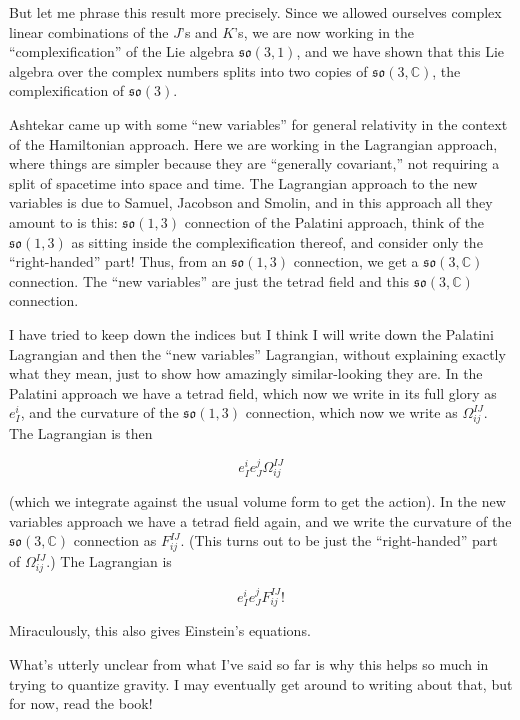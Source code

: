 \documentclass{article}
\begin{document}
But let me phrase this result more precisely. Since we allowed ourselves
complex linear combinations of the \(J\)'s and \(K\)'s, we are now
working in the ``complexification'' of the Lie algebra
\(\mathfrak{so}(3,1)\), and we have shown that this Lie algebra over the
complex numbers splits into two copies of
\(\mathfrak{so}(3,\mathbb{C})\), the complexification of
\(\mathfrak{so}(3)\).

Ashtekar came up with some ``new variables'' for general relativity in
the context of the Hamiltonian approach. Here we are working in the
Lagrangian approach, where things are simpler because they are
``generally covariant,'' not requiring a split of spacetime into space
and time. The Lagrangian approach to the new variables is due to Samuel,
Jacobson and Smolin, and in this approach all they amount to is this:
\(\mathfrak{so}(1,3)\) connection of the Palatini approach, think of the
\(\mathfrak{so}(1,3)\) as sitting inside the complexification thereof,
and consider only the ``right-handed'' part! Thus, from an
\(\mathfrak{so}(1,3)\) connection, we get a
\(\mathfrak{so}(3,\mathbb{C})\) connection. The ``new variables'' are
just the tetrad field and this \(\mathfrak{so}(3,\mathbb{C})\)
connection.

I have tried to keep down the indices but I think I will write down the
Palatini Lagrangian and then the ``new variables'' Lagrangian, without
explaining exactly what they mean, just to show how amazingly
similar-looking they are. In the Palatini approach we have a tetrad
field, which now we write in its full glory as \(e_I^i\), and the
curvature of the \(\mathfrak{so}(1,3)\) connection, which now we write
as \(\Omega_{ij}^{IJ}\). The Lagrangian is then

\[e_I^i e_J^j \Omega_{ij}^{IJ}\]

(which we integrate against the usual volume form to get the action). In
the new variables approach we have a tetrad field again, and we write
the curvature of the \(\mathfrak{so}(3,\mathbb{C})\) connection as
\(F_{ij}^{IJ}\). (This turns out to be just the ``right-handed'' part of
\(\Omega_{ij}^{IJ}\).) The Lagrangian is

\[e_I^i e_J^j F_{ij}^{IJ} !\]

Miraculously, this also gives Einstein's equations.

What's utterly unclear from what I've said so far is why this helps so
much in trying to quantize gravity. I may eventually get around to
writing about that, but for now, read the book!
\end{document}
